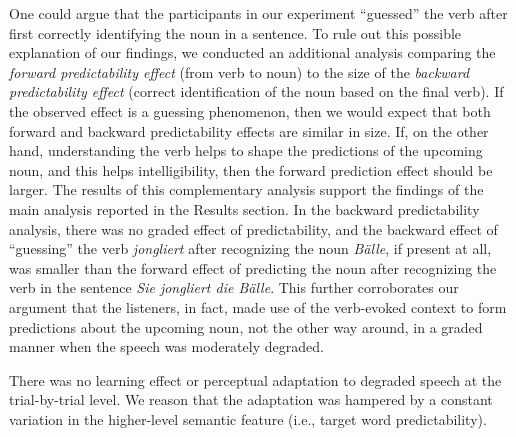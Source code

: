 \documentclass[a4paper, nobind]{templates/ociamthesis}
\begin{document}
One could argue that the participants in our experiment ``guessed'' the verb after first correctly identifying the noun in a sentence.
To rule out this possible explanation of our findings, we conducted an additional analysis comparing the \emph{forward predictability effect} (from verb to noun) to the size of the \emph{backward predictability effect} (correct identification of the noun based on the final verb).
If the observed effect is a guessing phenomenon, then we would expect that both forward and backward predictability effects are similar in size.
If, on the other hand, understanding the verb helps to shape the predictions of the upcoming noun, and this helps intelligibility, then the forward prediction effect should be larger.
The results of this complementary analysis support the findings of the main analysis reported in the Results section.
In the backward predictability analysis, there was no graded effect of predictability, and the backward effect of ``guessing'' the verb \emph{jongliert} after recognizing the noun \emph{Bälle}, if present at all, was smaller than the forward effect of predicting the noun after recognizing the verb in the sentence \emph{Sie jongliert die Bälle}.
This further corroborates our argument that the listeners, in fact, made use of the verb-evoked context to form predictions about the upcoming noun, not the other way around, in a graded manner when the speech was moderately degraded.

There was no learning effect or perceptual adaptation to degraded speech at the trial-by-trial level.
We reason that the adaptation was hampered by a constant variation in the higher-level semantic feature (i.e., target word predictability).
\end{document}
